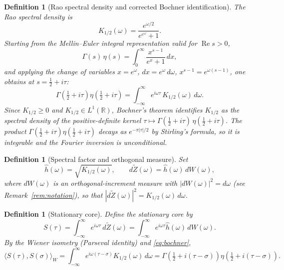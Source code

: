 \documentclass[11pt,a4paper]{article}
\newtheorem{definition}[theorem]{Definition}
\begin{document}
\begin{definition}[Rao spectral density and corrected Bochner identification]
\label{def:rao}
The \emph{Rao spectral density} is
\begin{equation}
  K_{1/2}(\omega)=\frac{e^{\omega/2}}{e^{e^\omega}+1}.
\end{equation}
Starting from the Mellin--Euler integral representation valid for
$\operatorname{Re}s>0$,
\begin{equation}
  \Gamma(s)\,\eta(s)=\int_0^{\infty}\frac{x^{s-1}}{e^x+1}\,dx,
\end{equation}
and applying the change of variables $x=e^{\omega}$,
$dx=e^{\omega}\,d\omega$, $x^{s-1}=e^{\omega(s-1)}$, one obtains at
$s=\tfrac{1}{2}+i\tau$:
\begin{equation}
  \label{eq:bochner}
  \Gamma\!\left(\tfrac{1}{2}+i\tau\right)
  \eta\!\left(\tfrac{1}{2}+i\tau\right)
  =\int_{-\infty}^{\infty} e^{i\omega\tau}\,K_{1/2}(\omega)\,d\omega.
\end{equation}
Since $K_{1/2}\ge 0$ and $K_{1/2}\in L^1(\mathbb{R})$, Bochner's theorem
identifies $K_{1/2}$ as the spectral density of the positive-definite
kernel
$\tau\mapsto\Gamma(\tfrac{1}{2}+i\tau)\,\eta(\tfrac{1}{2}+i\tau)$.
The product $\Gamma(\tfrac{1}{2}+i\tau)\eta(\tfrac{1}{2}+i\tau)$
decays as $e^{-\pi|\tau|/2}$ by Stirling's formula, so it is integrable and
the Fourier inversion is unconditional.
\end{definition}

\begin{definition}[Spectral factor and orthogonal measure]
\label{def:spectral-factor}
Set
\begin{equation}
  \hat{h}(\omega)=\sqrt{K_{1/2}(\omega)},
  \qquad
  d\widetilde{Z}(\omega)=\hat{h}(\omega)\,dW(\omega),
\end{equation}
where $dW(\omega)$ is an orthogonal-increment measure with
$|dW(\omega)|^2=d\omega$ (see Remark~\ref{rem:notation}), so that
$|d\widetilde{Z}(\omega)|^2=K_{1/2}(\omega)\,d\omega$.
\end{definition}

\begin{definition}[Stationary core]
\label{def:stationary-core}
Define the \emph{stationary core} by
\begin{equation}
  \label{eq:S-def}
  S(\tau)=\int_{-\infty}^{\infty} e^{i\omega\tau}\,d\widetilde{Z}(\omega)
  =\int_{-\infty}^{\infty} e^{i\omega\tau}\hat{h}(\omega)\,dW(\omega).
\end{equation}
By the Wiener isometry (Parseval identity) and \eqref{eq:bochner},
\begin{equation}
  \label{eq:S-covariance}
  \langle S(\tau),S(\sigma)\rangle_W
  =\int_{-\infty}^{\infty} e^{i\omega(\tau-\sigma)}K_{1/2}(\omega)\,d\omega
  =\Gamma\!\left(\tfrac{1}{2}+i(\tau-\sigma)\right)
   \eta\!\left(\tfrac{1}{2}+i(\tau-\sigma)\right).
\end{equation}
\end{definition}
\end{document}
